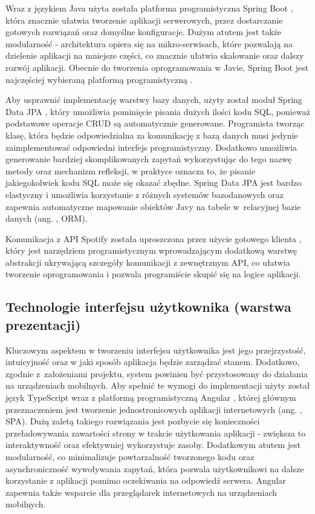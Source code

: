 Wraz z językiem Java użyta została platforma programistyczna Spring Boot \cite{bib:spring_boot}, która znacznie ułatwia tworzenie aplikacji serwerowych, przez dostarczanie gotowych rozwiązań oraz domyślne konfiguracje. Dużym atutem jest także modularność - architektura opiera się na mikro-serwisach, które pozwalają na dzielenie aplikacji na mniejsze części, co znacznie ułatwia skalowanie oraz dalszy rozwój aplikacji. Obecnie do tworzenia oprogramowania w Javie, Spring Boot jest najczęściej wybieraną platformą programistyczną \cite{bib:spring_market_analysis}.

Aby usprawnić implementację warstwy bazy danych, użyty został moduł Spring Data JPA \cite{bib:spring_jpa}, który umożliwia pominięcie pisania dużych ilości kodu SQL, ponieważ podstawowe operacje CRUD są automatycznie generowane. Programista tworząc klasę, która będzie odpowiedzialna za komunikację z bazą danych musi jedynie zaimplementować odpowiedni interfejs programistyczny. Dodatkowo umożliwia generowanie bardziej skomplikowanych zapytań wykorzystując do tego nazwę metody oraz mechanizm refleksji, w praktyce oznacza to, że pisanie jakiegokolwiek kodu SQL może się okazać zbędne. Spring Data JPA jest bardzo elastyczny i umożliwia korzystanie z różnych systemów bazodanowych oraz zapewnia automatyczne mapowanie obiektów Javy na tabele w~relacyjnej bazie danych (ang. , ORM).

Komunikacja z API Spotify została uproszczona przez użycie gotowego klienta \cite{bib:spotify_client_java}, który jest narzędziem programistycznym wprowadzającym dodatkową warstwę abstrakcji ukrywającą szczegóły komunikacji z zewnętrznym API, co ułatwia tworzenie oprogramowania i pozwala programiście skupić się na logice aplikacji.

\subsection{Technologie interfejsu użytkownika (warstwa prezentacji)}
Kluczowym aspektem w tworzeniu interfejsu użytkownika jest jego przejrzystość, intuicyjność oraz w jaki sposób aplikacja będzie zarządzać stanem. Dodatkowo, zgodnie z~założeniami projektu, system powinien być przystosowany do działania na urządzeniach mobilnych. Aby spełnić te wymogi do implementacji użyty został język TypeScript wraz z platformą programistyczną Angular \cite{bib:angular}, której głównym przeznaczeniem jest tworzenie jednostronicowych aplikacji internetowych (ang. , SPA). Dużą zaletą takiego rozwiązania jest pozbycie się konieczności przeładowywania zawartości strony w trakcie użytkowania aplikacji - zwiększa to interaktywność oraz efektywniej wykorzystuje zasoby. Dodatkowym atutem jest modularność, co minimalizuje powtarzalność tworzonego kodu oraz asynchroniczność wywoływania zapytań, która pozwala użytkownikowi na dalsze korzystanie z aplikacji pomimo oczekiwania na odpowiedź serwera. Angular zapewnia także wsparcie dla przeglądarek internetowych na urządzeniach mobilnych.

